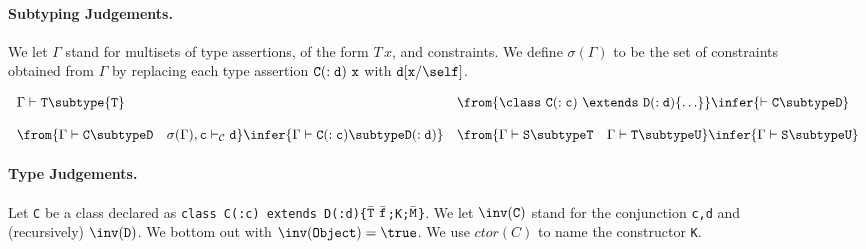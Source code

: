 \begin{figure*}
\paragraph{Subtyping Judgements.}
We let $\Gamma$ stand for multisets of type assertions, of the form
$T\,x$, and constraints. We define $\sigma(\Gamma)$ to be the set of
constraints obtained from $\Gamma$ by replacing each type assertion
${\tt C(:d)\ x}$ with ${\tt d}[{\tt x}/\self]$. 

$$
\begin{array}{ll}
\Gamma\vdash {\tt T} \subtype {\tt T}
&
\from{\class\ {\tt C(:c)}\ \extends\ {\tt D(:d)}\{\ldots\}}
\infer{\vdash {\tt C \subtype D}}
\\ & \\
\from{\Gamma \vdash {\tt C \subtype D} \ \ \ \sigma(\Gamma),{\tt c} \vdash_{\cal C} {\tt d}}
\infer{\Gamma \vdash {\tt C(:c) \subtype D(:d)}}
&
\from{\Gamma \vdash {\tt S \subtype T} \ \ \ \Gamma \vdash {\tt T \subtype U}}
\infer{\Gamma \vdash {\tt S \subtype U}}
\end{array}
$$

\paragraph{Type Judgements.}

Let {\tt C} be a class declared as {\tt class C(:c) extends
D(:d)\{$\bar{\tt T}\ \bar{\tt f}$;{\tt K};$\bar{\tt M}$\}}. We let
$\inv({\tt C})$ stand for the conjunction {\tt c,d} and (recursively)
$\inv({\tt D})$. We bottom out with $\inv({\tt Object})=\true$. We use
$ctor(C)$ to name the constructor {\tt K}.


\end{figure*}
